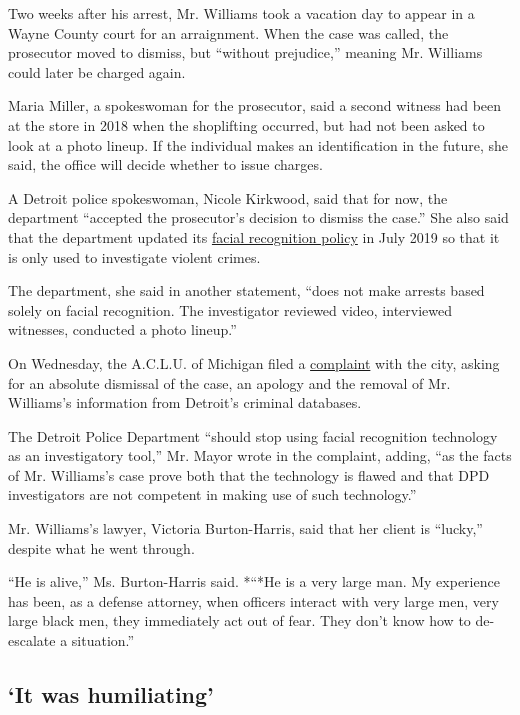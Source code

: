 Two weeks after his arrest, Mr. Williams took a vacation day to appear
in a Wayne County court for an arraignment. When the case was called,
the prosecutor moved to dismiss, but ``without prejudice,'' meaning Mr.
Williams could later be charged again.

Maria Miller, a spokeswoman for the prosecutor, said a second witness
had been at the store in 2018 when the shoplifting occurred, but had not
been asked to look at a photo lineup. If the individual makes an
identification in the future, she said, the office will decide whether
to issue charges.

A Detroit police spokeswoman, Nicole Kirkwood, said that for now, the
department ``accepted the prosecutor's decision to dismiss the case.''
She also said that the department updated its
\href{https://detroitmi.gov/sites/detroitmi.localhost/files/2019-07/FACIAL\%20RECOGNITION\%20Directive\%20307.5_0.pdf}{facial
recognition policy} in July 2019 so that it is only used to investigate
violent crimes.

The department, she said in another statement, ``does not make arrests
based solely on facial recognition. The investigator reviewed video,
interviewed witnesses, conducted a photo lineup.''

On Wednesday, the A.C.L.U. of Michigan filed a
\href{https://www.aclu.org/letter/aclu-michigan-complaint-re-use-facial-recognition}{complaint}
with the city, asking for an absolute dismissal of the case, an apology
and the removal of Mr. Williams's information from Detroit's criminal
databases.

The Detroit Police Department ``should stop using facial recognition
technology as an investigatory tool,'' Mr. Mayor wrote in the complaint,
adding, ``as the facts of Mr. Williams's case prove both that the
technology is flawed and that DPD investigators are not competent in
making use of such technology.''

Mr. Williams's lawyer, Victoria Burton-Harris, said that her client is
``lucky,'' despite what he went through.

``He is alive,'' Ms. Burton-Harris said. *``*He is a very large man. My
experience has been, as a defense attorney, when officers interact with
very large men, very large black men, they immediately act out of fear.
They don't know how to de-escalate a situation.''

\hypertarget{it-was-humiliating}{%
\subsection{`It was humiliating'}\label{it-was-humiliating}}

